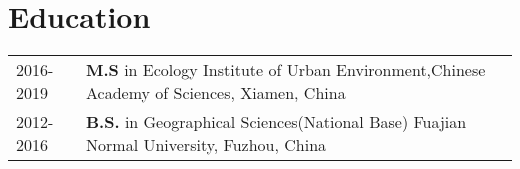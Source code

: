 \section*{Education}
\begin{tabular}{p{} p{}}
2016-2019 & \textbf{M.S} in Ecology \newline
       Institute of Urban Environment,Chinese Academy of Sciences, Xiamen, China \\

2012-2016 & \textbf{B.S.} in Geographical Sciences(National Base) \newline
       Fuajian Normal University, Fuzhou, China
\end{tabular}
